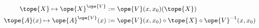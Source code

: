 \begin{equation}	\label{12.14}
	\begin{split}
\tope{X} \mapsto \ope{X}^{\ope{V}}
  & := \ope{V}(x,x_0) (\tope{X})
\\
\tope{A}(x) \mapsto \ope{A}^{\ope{V}}(x)
  & := \ope{V}(x,x_0)\circ\tope{X}\circ\ope{V}^{-1}(x,x_0)
	\end{split}
	\end{equation}

